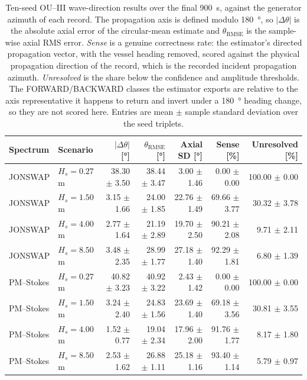 \begin{table}[t]
  \centering
  \caption{Ten-seed OU--III wave-direction results over the final \SI{900}{s}, against the generator azimuth of each record. The propagation axis is defined modulo \SI{180}{\degree}, so $|\Delta\theta|$ is the absolute axial error of the circular-mean estimate and $\theta_{\mathrm{RMSE}}$ is the sample-wise axial RMS error. \emph{Sense} is a genuine correctness rate: the estimator's directed propagation vector, with the vessel heading removed, scored against the physical propagation direction of the record, which is the recorded incident propagation azimuth. \emph{Unresolved} is the share below the confidence and amplitude thresholds. The FORWARD/BACKWARD classes the estimator exports are relative to the axis representative it happens to return and invert under a \SI{180}{\degree} heading change, so they are not scored here. Entries are mean $\pm$ sample standard deviation over the seed triplets.}
  \label{tab:ou_mc_direction}
  \footnotesize
  \setlength{\tabcolsep}{3.6pt}
  \begin{tabular}{@{}llrrrrr@{}}
    \toprule
    Spectrum & Scenario & $|\Delta\theta|$ [\si{\degree}] & $\theta_{\mathrm{RMSE}}$ [\si{\degree}] & Axial SD [\si{\degree}] & Sense [\%] & Unresolved [\%] \\
    \midrule
    JONSWAP & $H_s=0.27$ m & 38.30 $\pm$ 3.50 & 38.44 $\pm$ 3.47 & 3.00 $\pm$ 1.46 & 0.00 $\pm$ 0.00 & 100.00 $\pm$ 0.00 \\
    JONSWAP & $H_s=1.50$ m & 3.15 $\pm$ 1.66 & 24.00 $\pm$ 1.85 & 22.76 $\pm$ 1.49 & 69.66 $\pm$ 3.77 & 30.32 $\pm$ 3.78 \\
    JONSWAP & $H_s=4.00$ m & 2.77 $\pm$ 1.64 & 21.19 $\pm$ 2.89 & 19.70 $\pm$ 2.50 & 90.21 $\pm$ 2.08 & 9.71 $\pm$ 2.11 \\
    JONSWAP & $H_s=8.50$ m & 3.48 $\pm$ 2.35 & 28.99 $\pm$ 1.77 & 27.18 $\pm$ 1.40 & 92.29 $\pm$ 1.81 & 6.80 $\pm$ 1.39 \\
    PM--Stokes & $H_s=0.27$ m & 40.82 $\pm$ 3.23 & 40.92 $\pm$ 3.22 & 2.43 $\pm$ 1.42 & 0.00 $\pm$ 0.00 & 100.00 $\pm$ 0.00 \\
    PM--Stokes & $H_s=1.50$ m & 3.24 $\pm$ 2.40 & 24.83 $\pm$ 1.56 & 23.69 $\pm$ 1.40 & 69.18 $\pm$ 3.56 & 30.81 $\pm$ 3.55 \\
    PM--Stokes & $H_s=4.00$ m & 1.52 $\pm$ 0.77 & 19.04 $\pm$ 2.34 & 17.96 $\pm$ 2.00 & 91.76 $\pm$ 1.77 & 8.17 $\pm$ 1.80 \\
    PM--Stokes & $H_s=8.50$ m & 2.53 $\pm$ 1.62 & 26.88 $\pm$ 1.11 & 25.18 $\pm$ 1.16 & 93.40 $\pm$ 1.14 & 5.79 $\pm$ 0.97 \\
    \bottomrule
  \end{tabular}
\end{table}


